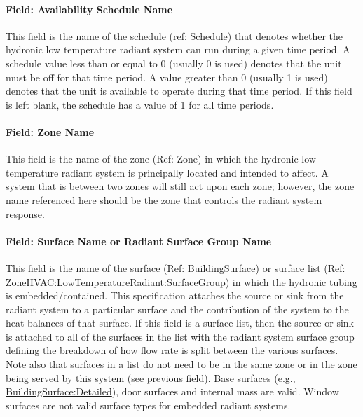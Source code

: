 \paragraph{Field: Availability Schedule Name}\label{field-availability-schedule-name-5-003}

This field is the name of the schedule (ref: Schedule) that denotes whether the hydronic low temperature radiant system can run during a given time period. A schedule value less than or equal to 0 (usually 0 is used) denotes that the unit must be off for that time period. A value greater than 0 (usually 1 is used) denotes that the unit is available to operate during that time period. If this field is left blank, the schedule has a value of 1 for all time periods.

\paragraph{Field: Zone Name}\label{field-zone-name-009}

This field is the name of the zone (Ref: Zone) in which the hydronic low temperature radiant system is principally located and intended to affect. A system that is between two zones will still act upon each zone; however, the zone name referenced here should be the zone that controls the radiant system response.

\paragraph{Field: Surface Name or Radiant Surface Group Name}\label{field-surface-name-or-radiant-surface-group-name}

This field is the name of the surface (Ref: BuildingSurface) or surface list (Ref: \hyperref[zonehvaclowtemperatureradiantsurfacegroup]{ZoneHVAC:LowTemperatureRadiant:SurfaceGroup}) in which the hydronic tubing is embedded/contained. This specification attaches the source or sink from the radiant system to a particular surface and the contribution of the system to the heat balances of that surface. If this field is a surface list, then the source or sink is attached to all of the surfaces in the list with the radiant system surface group defining the breakdown of how flow rate is split between the various surfaces. Note also that surfaces in a list do not need to be in the same zone or in the zone being served by this system (see previous field). Base surfaces (e.g., \hyperref[buildingsurfacedetailed]{BuildingSurface:Detailed}), door surfaces and internal mass are valid. Window surfaces are not valid surface types for embedded radiant systems.

